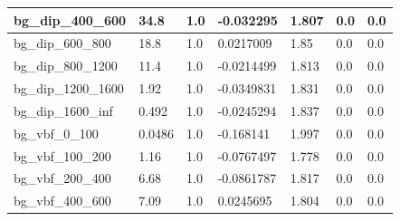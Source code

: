 \documentclass[a4paper, 10pt]{article}
\begin{document}
\begin{table}[H]
\begin{center}
\begin{tabular}{|m{23.0mm}|m{23.0mm}|m{18.0mm}|m{19.0mm}|m{19.0mm}|m{19.0mm}|m{19.0mm}|}
      \hline
      {\cellcolor{white}         bg\_dip\_400\_600}& {\cellcolor{white}         34.8}& {\cellcolor{white}         1.0}& {\cellcolor{white}         -0.032295}& {\cellcolor{white}         1.807}& {\cellcolor{green}         0.0}& {\cellcolor{green}         0.0}\\
      \hline
      {\cellcolor{white}         bg\_dip\_600\_800}& {\cellcolor{white}         18.8}& {\cellcolor{white}         1.0}& {\cellcolor{white}         0.0217009}& {\cellcolor{white}         1.85}& {\cellcolor{green}         0.0}& {\cellcolor{green}         0.0}\\
      \hline
      {\cellcolor{white}         bg\_dip\_800\_1200}& {\cellcolor{white}         11.4}& {\cellcolor{white}         1.0}& {\cellcolor{white}         -0.0214499}& {\cellcolor{white}         1.813}& {\cellcolor{green}         0.0}& {\cellcolor{green}         0.0}\\
      \hline
      {\cellcolor{white}         bg\_dip\_1200\_1600}& {\cellcolor{white}         1.92}& {\cellcolor{white}         1.0}& {\cellcolor{white}         -0.0349831}& {\cellcolor{white}         1.831}& {\cellcolor{green}         0.0}& {\cellcolor{green}         0.0}\\
      \hline
      {\cellcolor{white}         bg\_dip\_1600\_inf}& {\cellcolor{white}         0.492}& {\cellcolor{white}         1.0}& {\cellcolor{white}         -0.0245294}& {\cellcolor{white}         1.837}& {\cellcolor{green}         0.0}& {\cellcolor{green}         0.0}\\
      \hline
      {\cellcolor{white}         bg\_vbf\_0\_100}& {\cellcolor{white}         0.0486}& {\cellcolor{white}         1.0}& {\cellcolor{white}         -0.168141}& {\cellcolor{white}         1.997}& {\cellcolor{green}         0.0}& {\cellcolor{green}         0.0}\\
      \hline
      {\cellcolor{white}         bg\_vbf\_100\_200}& {\cellcolor{white}         1.16}& {\cellcolor{white}         1.0}& {\cellcolor{white}         -0.0767497}& {\cellcolor{white}         1.778}& {\cellcolor{green}         0.0}& {\cellcolor{green}         0.0}\\
      \hline
      {\cellcolor{white}         bg\_vbf\_200\_400}& {\cellcolor{white}         6.68}& {\cellcolor{white}         1.0}& {\cellcolor{white}         -0.0861787}& {\cellcolor{white}         1.817}& {\cellcolor{green}         0.0}& {\cellcolor{green}         0.0}\\
      \hline
      {\cellcolor{white}         bg\_vbf\_400\_600}& {\cellcolor{white}         7.09}& {\cellcolor{white}         1.0}& {\cellcolor{white}         0.0245695}& {\cellcolor{white}         1.804}& {\cellcolor{green}         0.0}& {\cellcolor{green}         0.0}\\

\end{tabular}
\end{center}
\end{table}
\end{document}

